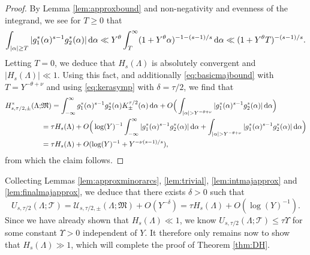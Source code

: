 \documentclass[11pt,reqno]{amsart}
\numberwithin{equation}{section}
\renewcommand{\d}{\,{\rm d}}
\begin{document}
\begin{proof} By Lemma \ref{lem:approxbound} and non-negativity and evenness of the integrand, we see for $T \geq 0$ that 
\begin{align} \label{eq:basicmajbound}
\int_{|\alpha| \geq T} |g_1^*(\alpha)^{s-1}g^*_2(\alpha)|\d\alpha \ll Y^{\theta}\int_{T}^{\infty} (1+Y^{\theta}\alpha)^{-1-(s-1)/s} \d\alpha \ll (1+Y^{\theta}T)^{-(s-1)/s}. 
\end{align}
Letting $T = 0$, we deduce that $H_s(\Lambda)$ is absolutely convergent and $|H_s(\Lambda)| \ll 1$. Using this fact, and additionally \eqref{eq:basicmajbound} with $T = Y^{-\theta+\nu}$ and using \eqref{eq:kerasymp} with $\delta = \tau/2$, we find that 
\begin{align*} 
H^*_{s,\tau/2,\pm}(\Lambda;& \mathfrak{M}) = \int_{-\infty}^{\infty} g_1^*(\alpha)^{s-1}g_2^*(\alpha) K_{\pm}^{\tau/2}(\alpha)\d\alpha + O \Big( \int_{|\alpha|>Y^{-\theta+\nu}} |g_1^*(\alpha)^{s-1}g_2^*(\alpha)| \d\alpha \Big)
\\ 
& = \tau H_s(\Lambda) +O\Big( \log(Y)^{-1}\int_{-\infty}^{\infty} |g_1^*(\alpha)^{s-1}g_2^*(\alpha)|\d\alpha+\int_{|\alpha|>Y^{-\theta+\nu}} |g_1^*(\alpha)^{s-1}g_2^*(\alpha)| \d\alpha \Big)
\\ 
& = \tau H_s(\Lambda)+O(\log(Y)^{-1}+Y^{-\nu(s-1)/s}),
\end{align*}
from which the claim follows. 
\end{proof}

Collecting Lemmas \ref{lem:approxminorarcs}, \ref{lem:trivial}, \ref{lem:intmajapprox} and \ref{lem:finalmajapprox}, we deduce that there exists $\delta > 0$ such that 
\[ U_{s,\tau/2}(\Lambda; \mathcal{T}) =  \mathcal{U}_{s,\tau/2,\pm}(\Lambda;\mathfrak{M}) + O(Y^{-\delta}) = \tau H_s(\Lambda)+O(\log(Y)^{-1}). \]
Since we have already shown that $H_s(\Lambda) \ll 1$, we know $U_{s,\tau/2}(\Lambda; \mathcal{T}) \leq \tau \Upsilon$ for some constant $\Upsilon > 0$ independent of $Y$. It therefore only remains now to show that $H_s(\Lambda) \gg 1$, which will complete the proof of Theorem \ref{thm:DH}. 
\end{document}

